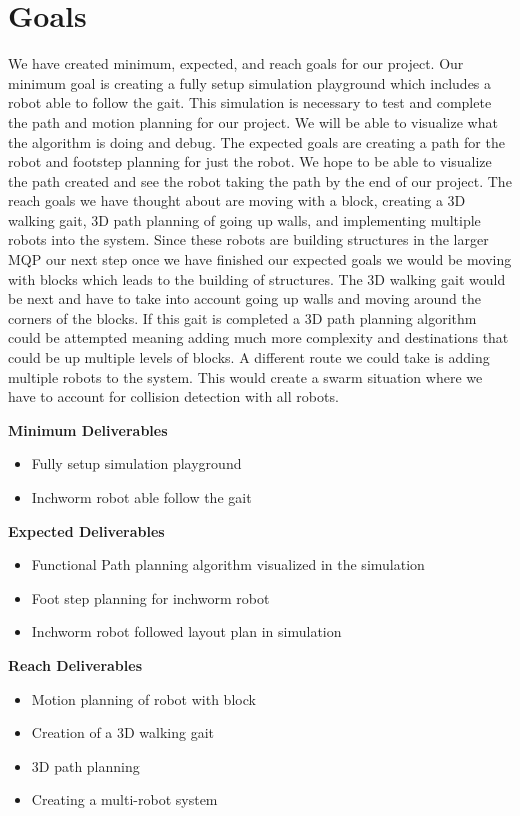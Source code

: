 \section{Goals}
We have created minimum, expected, and reach goals for our project. Our minimum goal is creating a fully setup simulation playground which includes a robot able to follow the gait. This simulation is necessary to test and complete the path and motion planning for our project. We will be able to visualize what the algorithm is doing and debug. The expected goals are creating a path for the robot and footstep planning for just the robot. We hope to be able to visualize the path created and see the robot taking the path by the end of our project. The reach goals we have thought about are moving with a block, creating a 3D walking gait, 3D path planning of going up walls, and implementing multiple robots into the system. Since these robots are building structures in the larger MQP our next step once we have finished our expected goals we would be moving with blocks which leads to the building of structures. The 3D walking gait would be next and have to take into account going up walls and moving around the corners of the blocks. If this gait is completed a 3D path planning algorithm could be attempted meaning adding much more complexity and destinations that could be up multiple levels of blocks. A different route we could take is adding multiple robots to the system. This would create a swarm situation where we have to account for collision detection with all robots.

\textbf{Minimum Deliverables}
\begin{itemize}
    \item Fully setup simulation playground
    \item Inchworm robot able follow the gait
\end{itemize}

\textbf{Expected Deliverables}
\begin{itemize}
    \item Functional Path planning algorithm visualized in the simulation
    \item Foot step planning for inchworm robot
    \item Inchworm robot followed layout plan in simulation
\end{itemize}

\textbf{Reach Deliverables}
\begin{itemize}
    \item Motion planning of robot with block
    \item Creation of a 3D walking gait 
    \item 3D path planning 
    \item Creating a multi-robot system
\end{itemize}
